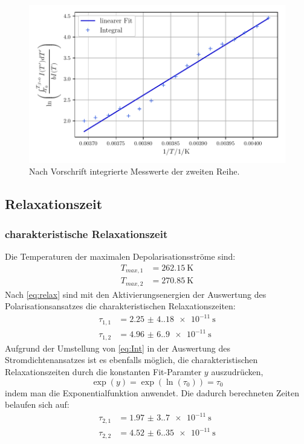 \begin{figure}
    \centering
    \includegraphics[width=0.8\linewidth]{scripts/build/plot2_2.pdf}
    \caption{Nach Vorschrift integrierte Messwerte der zweiten Reihe.}
    \label{fig:W2_2}
\end{figure}

\subsection{Relaxationszeit}
\subsubsection{charakteristische Relaxationszeit}
Die Temperaturen der maximalen Depolarisationsströme sind:
\begin{align}
    T_{max,1} &= \qty{262.15}{\kelvin} \\
    T_{max,2} &= \qty{270.85}{\kelvin}
\end{align}
Nach \autoref{eq:relax} sind mit den Aktivierungsenergien der Auswertung des Polarisationsansatzes
die charakteristischen Relaxationszeiten:
\begin{align}
    \tau_{1,1} &= \qty{2.25(4.18)e-11}{\second}\\
    \tau_{1,2} &= \qty{4.96(6.90)e-11}{\second}
\end{align}
Aufgrund der Umstellung von \autoref{eq:Int} in der Auswertung des Stromdichtenansatzes ist es ebenfalls möglich,
die charakteristischen Relaxationszeiten durch die konstanten Fit-Paramter $y$ auszudrücken,
\begin{equation}
    \exp(y) = \exp(\ln(\tau_0)) = \tau_0
\end{equation}
indem man die Exponentialfunktion anwendet.
Die dadurch berechneten Zeiten belaufen sich auf:
\begin{align}
    \tau_{2,1} &= \qty{1.97(3.70)e-11}{\second}\\
    \tau_{2,2} &= \qty{4.52(6.35)e-11}{\second}
\end{align}
